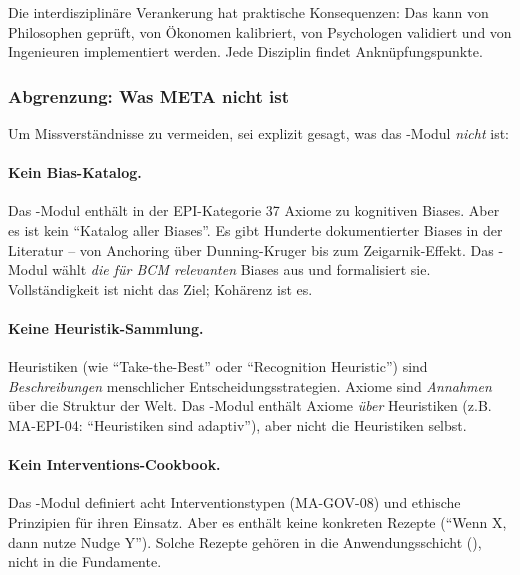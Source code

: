 Die interdisziplinäre Verankerung hat praktische Konsequenzen: Das \BCM{} kann von Philosophen geprüft, von Ökonomen kalibriert, von Psychologen validiert und von Ingenieuren implementiert werden. Jede Disziplin findet Anknüpfungspunkte.

\subsubsection{Abgrenzung: Was META nicht ist}

Um Missverständnisse zu vermeiden, sei explizit gesagt, was das \META-Modul \textit{nicht} ist:

\paragraph{Kein Bias-Katalog.}

Das \META-Modul enthält in der EPI-Kategorie 37 Axiome zu kognitiven Biases. Aber es ist kein ``Katalog aller Biases''. Es gibt Hunderte dokumentierter Biases in der Literatur -- von Anchoring über Dunning-Kruger bis zum Zeigarnik-Effekt. Das \META-Modul wählt \textit{die für BCM relevanten} Biases aus und formalisiert sie. Vollständigkeit ist nicht das Ziel; Kohärenz ist es.

\paragraph{Keine Heuristik-Sammlung.}

Heuristiken (wie ``Take-the-Best'' oder ``Recognition Heuristic'') sind \textit{Beschreibungen} menschlicher Entscheidungsstrategien. Axiome sind \textit{Annahmen} über die Struktur der Welt. Das \META-Modul enthält Axiome \textit{über} Heuristiken (z.B. MA-EPI-04: ``Heuristiken sind adaptiv''), aber nicht die Heuristiken selbst.

\paragraph{Kein Interventions-Cookbook.}

Das \META-Modul definiert acht Interventionstypen (MA-GOV-08) und ethische Prinzipien für ihren Einsatz. Aber es enthält keine konkreten Rezepte (``Wenn X, dann nutze Nudge Y''). Solche Rezepte gehören in die Anwendungsschicht (\BEATRIX), nicht in die Fundamente.

